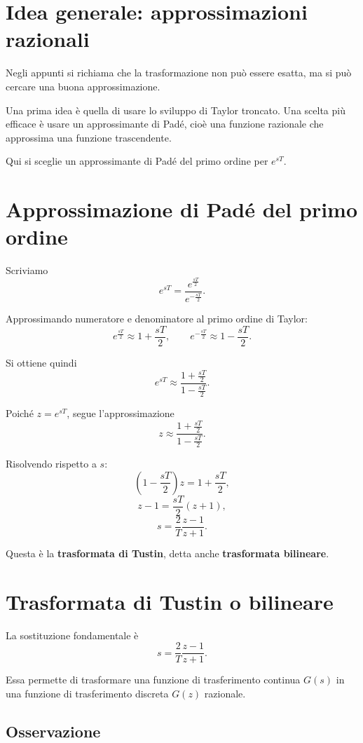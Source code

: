 \section{Idea generale: approssimazioni razionali}

Negli appunti si richiama che la trasformazione non pu\`o essere esatta,
ma si pu\`o cercare una buona approssimazione.

Una prima idea \`e quella di usare lo sviluppo di Taylor troncato.
Una scelta pi\`u efficace \`e usare un approssimante di Pad\'e,
cio\`e una funzione razionale che approssima una funzione trascendente.

Qui si sceglie un approssimante di Pad\'e del primo ordine per \(e^{sT}\).

\section{Approssimazione di Pad\'e del primo ordine}

Scriviamo
\[
e^{sT}= \frac{e^{\frac{sT}{2}}}{e^{-\frac{sT}{2}}}.
\]

Approssimando numeratore e denominatore al primo ordine di Taylor:
\[
e^{\frac{sT}{2}} \approx 1+\frac{sT}{2},
\qquad
e^{-\frac{sT}{2}} \approx 1-\frac{sT}{2}.
\]

Si ottiene quindi
\[
e^{sT}\approx \frac{1+\frac{sT}{2}}{1-\frac{sT}{2}}.
\]

Poich\'e \(z=e^{sT}\), segue l'approssimazione
\[
z\approx \frac{1+\frac{sT}{2}}{1-\frac{sT}{2}}.
\]

Risolvendo rispetto a \(s\):
\[
\left(1-\frac{sT}{2}\right)z = 1+\frac{sT}{2},
\]
\[
z-1=\frac{sT}{2}(z+1),
\]
\[
s=\frac{2}{T}\frac{z-1}{z+1}.
\]

Questa \`e la \textbf{trasformata di Tustin}, detta anche \textbf{trasformata bilineare}.

\section{Trasformata di Tustin o bilineare}

La sostituzione fondamentale \`e
\[
s=\frac{2}{T}\frac{z-1}{z+1}.
\]

Essa permette di trasformare una funzione di trasferimento continua \(G(s)\)
in una funzione di trasferimento discreta \(G(z)\) razionale.

\subsection*{Osservazione}

